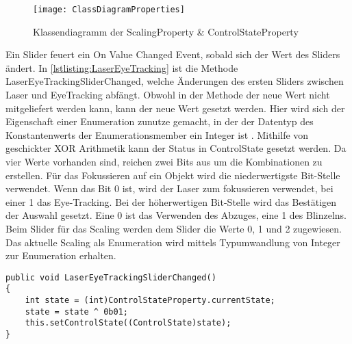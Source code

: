 \begin{figure}[!htbp]
	\centering
	\texttt{[image: ClassDiagramProperties]}
	\caption[Klassendiagramm der ScalingProperty \& ControlStateProperty]{Klassendiagramm der ScalingProperty \& ControlStateProperty}
	\label{fig:ClassDiagrammProperties}
\end{figure}

Ein Slider feuert ein On Value Changed Event, sobald sich der Wert des Sliders ändert. In \autoref{lstlisting:LaserEyeTracking} ist die Methode LaserEyeTrackingSliderChanged, welche Änderungen des ersten Sliders zwischen Laser und EyeTracking abfängt. Obwohl in der Methode der neue Wert nicht mitgeliefert werden kann, kann der neue Wert gesetzt werden. Hier wird sich der Eigenschaft einer Enumeration zunutze gemacht, in der der Datentyp des Konstantenwerts der Enumerationsmember ein Integer ist \cite{BillWagner.2020}. Mithilfe von geschickter XOR Arithmetik kann der Status in ControlState gesetzt werden. Da vier Werte vorhanden sind, reichen zwei Bits aus um die Kombinationen zu erstellen. Für das Fokussieren auf ein Objekt wird die niederwertigste Bit-Stelle verwendet. Wenn das Bit 0 ist, wird der Laser zum fokussieren verwendet, bei einer 1 das Eye-Tracking. Bei der höherwertigen Bit-Stelle wird das Bestätigen der Auswahl gesetzt. Eine 0 ist das Verwenden des Abzuges, eine 1 des Blinzelns. Beim Slider für das Scaling werden dem Slider die Werte 0, 1 und 2 zugewiesen. Das aktuelle Scaling als Enumeration wird mittels Typumwandlung von Integer zur Enumeration erhalten.

\begin{lstlisting}[caption=Method LaserEyeTrackingSliderChanged,label=lstlisting:LaserEyeTracking]
public void LaserEyeTrackingSliderChanged()
{
    int state = (int)ControlStateProperty.currentState;
    state = state ^ 0b01;
    this.setControlState((ControlState)state);
}
\end{lstlisting}

